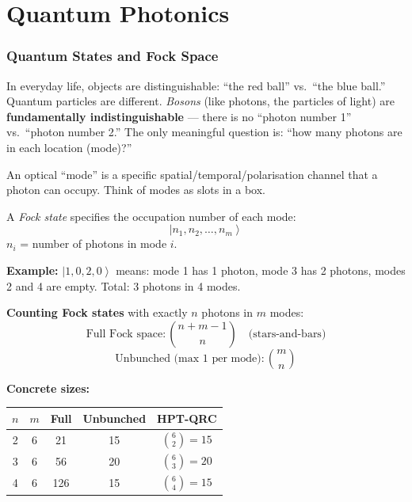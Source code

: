 \documentclass[11pt]{article}
\newcommand{\concept}[2]{%
  \begin{tcolorbox}[conceptbox, title={#1}]
  #2
  \end{tcolorbox}
}
\newcommand{\mathblock}[2]{%
  \begin{tcolorbox}[mathbox, title={Math: #1}]
  #2
  \end{tcolorbox}
}
\providecommand{\ket}[1]{\left| #1 \right\rangle}
\begin{document}
\part{Quantum Photonics}

\section{Quantum States and Fock Space}

\concept{Particles That Are All Identical --- Bosons}{
In everyday life, objects are distinguishable: ``the red ball'' vs.\ ``the blue ball.'' Quantum particles are different. \emph{Bosons} (like photons, the particles of light) are \textbf{fundamentally indistinguishable} --- there is no ``photon number 1'' vs.\ ``photon number 2.'' The only meaningful question is: ``how many photons are in each location (mode)?''

An optical ``mode'' is a specific spatial/temporal/polarisation channel that a photon can occupy. Think of modes as slots in a box.
}

\mathblock{Fock States}{
A \emph{Fock state} specifies the occupation number of each mode:
\[
  \ket{n_1, n_2, \ldots, n_m}
\]
$n_i$ = number of photons in mode $i$.

\textbf{Example:} $\ket{1, 0, 2, 0}$ means: mode 1 has 1 photon, mode 3 has 2 photons, modes 2 and 4 are empty. Total: 3 photons in 4 modes.

\textbf{Counting Fock states} with exactly $n$ photons in $m$ modes:
\[
  \text{Full Fock space}: \binom{n+m-1}{n} \quad \text{(stars-and-bars)}
\]
\[
  \text{Unbunched (max 1 per mode)}: \binom{m}{n}
\]

\textbf{Concrete sizes:}
\begin{center}
\begin{tabular}{ccccc}
\toprule
$n$ & $m$ & Full & Unbunched & HPT-QRC \\
\midrule
2 & 6 & 21 & 15 & $\binom{6}{2}=15$ \\
3 & 6 & 56 & 20 & $\binom{6}{3}=20$ \\
4 & 6 & 126 & 15 & $\binom{6}{4}=15$ \\
\bottomrule
\end{tabular}
\end{center}
}
\end{document}
